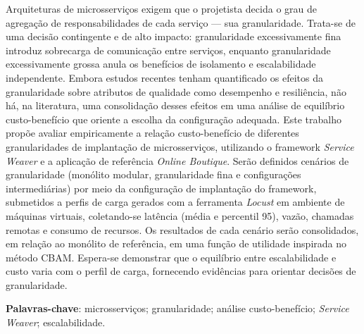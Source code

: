 
\begin{resumo}
    \noindent

    Arquiteturas de microsserviços exigem que o projetista decida o grau de agregação de responsabilidades de cada serviço --- sua granularidade. Trata-se de uma decisão contingente e de alto impacto: granularidade excessivamente fina introduz sobrecarga de comunicação entre serviços, enquanto granularidade excessivamente grossa anula os benefícios de isolamento e escalabilidade independente. Embora estudos recentes tenham quantificado os efeitos da granularidade sobre atributos de qualidade como desempenho e resiliência, não há, na literatura, uma consolidação desses efeitos em uma análise de equilíbrio custo-benefício que oriente a escolha da configuração adequada. Este trabalho propõe avaliar empiricamente a relação custo-benefício de diferentes granularidades de implantação de microsserviços, utilizando o framework \textit{Service Weaver} e a aplicação de referência \textit{Online Boutique}. Serão definidos cenários de granularidade (monólito modular, granularidade fina e configurações intermediárias) por meio da configuração de implantação do framework, submetidos a perfis de carga gerados com a ferramenta \textit{Locust} em ambiente de máquinas virtuais, coletando-se latência (média e percentil 95), vazão, chamadas remotas e consumo de recursos. Os resultados de cada cenário serão consolidados, em relação ao monólito de referência, em uma função de utilidade inspirada no método CBAM. Espera-se demonstrar que o equilíbrio entre escalabilidade e custo varia com o perfil de carga, fornecendo evidências para orientar decisões de granularidade.

    \textbf{Palavras-chave}: microsserviços; granularidade; análise custo-benefício; \textit{Service Weaver}; escalabilidade.
\end{resumo}


